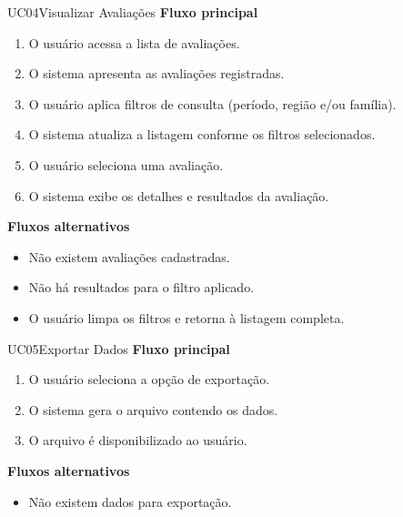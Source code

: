 \begin{usecase}{UC04}{Visualizar Avaliações}
    \uclinha
    \uclinha
    \uclinha
    \textbf{Fluxo principal}
    \vspace{4pt}
    \begin{enumerate}
        \item O usuário acessa a lista de avaliações.
        \item O sistema apresenta as avaliações registradas.
        \item O usuário aplica filtros de consulta (período, região e/ou família).
        \item O sistema atualiza a listagem conforme os filtros selecionados.
        \item O usuário seleciona uma avaliação.
        \item O sistema exibe os detalhes e resultados da avaliação.
    \end{enumerate}
    \uclinha
    \textbf{Fluxos alternativos}
    \vspace{4pt}
    \begin{itemize}
        \item Não existem avaliações cadastradas.
        \item Não há resultados para o filtro aplicado.
        \item O usuário limpa os filtros e retorna à listagem completa.
    \end{itemize}
    \uclinha
\end{usecase}

\vspace{8pt}

\begin{usecase}{UC05}{Exportar Dados}
    \uclinha
    \uclinha
    \uclinha
    \textbf{Fluxo principal}
    \vspace{4pt}
    \begin{enumerate}
        \item O usuário seleciona a opção de exportação.
        \item O sistema gera o arquivo contendo os dados.
        \item O arquivo é disponibilizado ao usuário.
    \end{enumerate}
    \uclinha
    \textbf{Fluxos alternativos}
    \vspace{4pt}
    \begin{itemize}
        \item Não existem dados para exportação.
    \end{itemize}
    \uclinha
\end{usecase}

